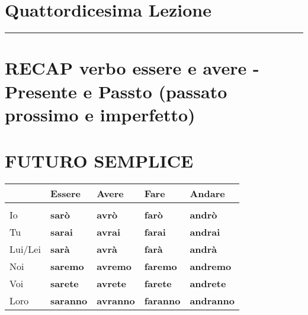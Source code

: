 \documentclass[letter,11pt]{article}
\begin{document}
\section*{\Large{Quattordicesima Lezione}}
\noindent\rule{16cm}{1pt}

\setlength{\parindent}{260pt}

\section*{RECAP verbo essere e avere - Presente e Passto (passato prossimo e imperfetto)}

\vskip 0.1in
\section*{FUTURO SEMPLICE}
\vskip 0.1in

\begin{tabular}{ |p{2cm}| p{3cm}| p{3cm}| p{3cm}| p{3cm}| }
      & Essere & Avere & Fare & Andare  \\
    \hline
    \hline
     &  &  &  & \\ \hline
    Io      & {\bf sarò}      & {\bf avrò}     &  {\bf farò} &  {\bf andrò} \\ \hline
    Tu      & {\bf sarai}     & {\bf avrai}  &  {\bf farai} &  {\bf andrai}  \\ \hline
    Lui/Lei & {\bf sarà}      & {\bf avrà}   &  {\bf farà} &  {\bf andrà}\\ \hline
    Noi     & {\bf saremo} & {\bf avremo} & {\bf faremo} &  {\bf andremo} \\ \hline
    Voi     & {\bf sarete}   & {\bf avrete}   &  {\bf farete} &  {\bf andrete}  \\ \hline
    Loro    & {\bf saranno}   & {\bf avranno}   &  {\bf faranno} &  {\bf andranno}  \\ \hline
    \hline
\end{tabular}

\vskip 0.5in
\end{document}
